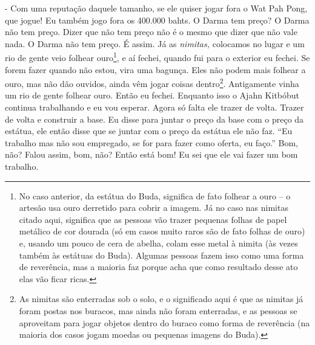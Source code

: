 {}- Com uma reputação daquele tamanho, se ele quiser jogar fora o
Wat Pah Pong, que jogue! Eu também jogo fora os 400.000 bahts. O Darma
tem preço? O Darma não tem preço. Dizer que não tem preço não é o mesmo
que dizer que não vale nada. O Darma não tem preço. É assim. Já as
\textit{nimitas,} colocamos no lugar e um rio de gente veio folhear
ouro\footnote{No caso anterior, da estátua do Buda, significa de fato
folhear a ouro – o artesão usa ouro derretido para cobrir a imagem. Já
no caso nas nimitas citado aqui, significa que as pessoas vão trazer
pequenas folhas de papel metálico de cor dourada (só em casos muito
raros são de fato folhas de ouro) e, usando um pouco de cera de abelha,
colam esse metal à nimita (às vezes também às estátuas do Buda).
Algumas pessoas fazem isso como uma forma de reverência, mas a maioria
faz porque acha que como resultado desse ato elas vão ficar ricas.}, e
aí fechei, quando fui para o exterior eu fechei. Se forem fazer quando
não estou, vira uma bagunça. Eles não podem mais folhear a ouro, mas
não dão ouvidos, ainda vêm jogar coisas dentro\footnote{As nimitas são
enterradas sob o solo, e o significado aqui é que as nimitas já foram
postas nos buracos, mas ainda não foram enterradas, e as pessoas se
aproveitam para jogar objetos dentro do buraco como forma de reverência
(na maioria dos casos jogam moedas ou pequenas imagens do Buda).}.
Antigamente vinha um rio de gente folhear ouro. Então eu fechei.
Enquanto isso o Ajahn Kitbóbut continua trabalhando e eu vou esperar.
Agora só falta ele trazer de volta. Trazer de volta e construir a base.
Eu disse para juntar o preço da base com o preço da estátua, ele então
disse que se juntar com o preço da estátua ele não faz. “Eu trabalho
mas não sou empregado, se for para fazer como oferta, eu faço.” Bom,
não? Falou assim, bom, não? Então está bom! Eu sei que ele vai fazer um
bom trabalho.

